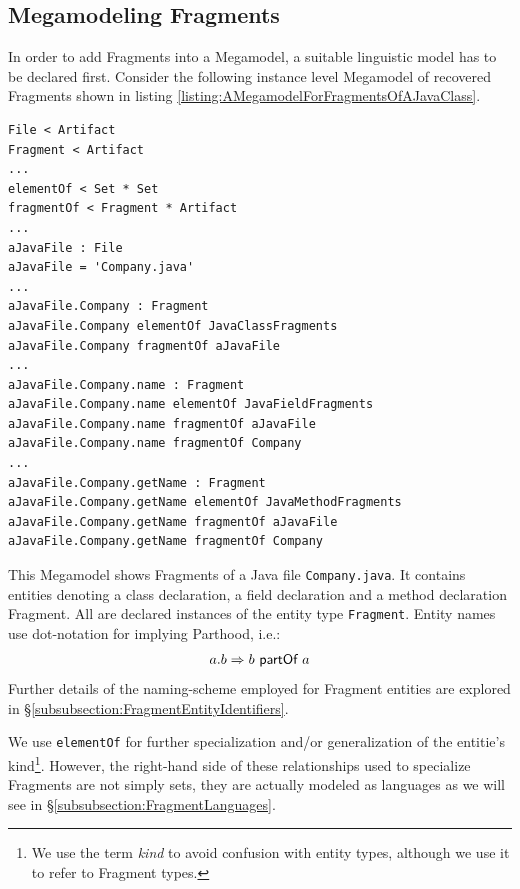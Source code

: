 \subsection{Megamodeling Fragments}
\label{subsection:MegamodelingFragments}
In order to add \glspl{Fragment} into a \gls{Megamodel}, a suitable linguistic model has to be declared first. 
Consider the following instance level \gls{Megamodel} of recovered \glspl{Fragment} shown in listing \ref{listing:AMegamodelForFragmentsOfAJavaClass}.
\begin{lstlisting}[caption={A Megamodel for fragments of a Java class},label={listing:AMegamodelForFragmentsOfAJavaClass}]
File < Artifact
Fragment < Artifact
...
elementOf < Set * Set
fragmentOf < Fragment * Artifact
...
aJavaFile : File
aJavaFile = 'Company.java'
...
aJavaFile.Company : Fragment
aJavaFile.Company elementOf JavaClassFragments
aJavaFile.Company fragmentOf aJavaFile
...
aJavaFile.Company.name : Fragment
aJavaFile.Company.name elementOf JavaFieldFragments
aJavaFile.Company.name fragmentOf aJavaFile
aJavaFile.Company.name fragmentOf Company
...
aJavaFile.Company.getName : Fragment
aJavaFile.Company.getName elementOf JavaMethodFragments
aJavaFile.Company.getName fragmentOf aJavaFile
aJavaFile.Company.getName fragmentOf Company
\end{lstlisting}
This \gls{Megamodel} shows \glspl{Fragment} of a \gls{Java} file \texttt{Company.java}.
It contains entities denoting a class declaration, a field declaration and a method declaration \gls{Fragment}.
All are declared instances of the entity type \texttt{Fragment}.
Entity names use dot-notation for implying \gls{Parthood}, i.e.:
\begin{align*}
a.b \Rightarrow b ~ \textsf{partOf} ~ a
\end{align*}
Further details of the naming-scheme employed for \gls{Fragment} entities are explored in §\ref{subsubsection:FragmentEntityIdentifiers}.

We use \texttt{elementOf} for further specialization and/or generalization of the entitie's kind\footnote{We use the term \textit{kind} to avoid confusion with entity types, although we use it to refer to \gls{Fragment} types.}.
However, the right-hand side of these relationships used to specialize \glspl{Fragment} are not simply sets, they are actually modeled as languages as we will see in §\ref{subsubsection:FragmentLanguages}.

